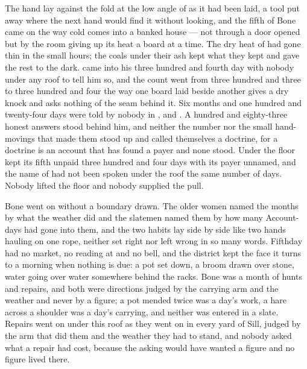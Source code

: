 
The hand lay against the fold at the low angle of  as it had been laid, a tool put away where the next hand would find it without looking, and the fifth of Bone came on the way cold comes into a banked house --- not through a door opened but by the room giving up its heat a board at a time. The dry heat of  had gone thin in the small hours; the coals under their ash kept what they kept and gave the rest to the dark.  came into his three hundred and fourth day with nobody under any roof to tell him so, and the count went from three hundred and three to three hundred and four the way one board laid beside another gives a dry knock and asks nothing of the seam behind it. Six months and one hundred and twenty-four days were told by nobody in ,  and . A hundred and eighty-three honest answers stood behind him, and neither the number nor the small hand-movings that made them stood up and called themselves a doctrine, for a doctrine is an account that has found a payer and none stood. Under the floor  kept its fifth unpaid three hundred and four days with its payer unnamed, and the name of  had not been spoken under the roof the same number of days. Nobody lifted the floor and nobody supplied the pull.

Bone went on without a boundary drawn. The older women named the months by what the weather did and the slatemen named them by how many Account-days had gone into them, and the two habits lay side by side like two hands hauling on one rope, neither set right nor left wrong in so many words. Fifthday had no market, no reading at  and no bell, and the district kept the face it turns to a morning when nothing is due: a pot set down, a broom drawn over stone, water going over water somewhere behind the racks. Bone was a month of hunts and repairs, and both were directions judged by the carrying arm and the weather and never by a figure; a pot mended twice was a day's work, a hare across a shoulder was a day's carrying, and neither was entered in a slate. Repairs went on under this roof as they went on in every yard of Sill, judged by the arm that did them and the weather they had to stand, and nobody asked what a repair had cost, because the asking would have wanted a figure and no figure lived there.


